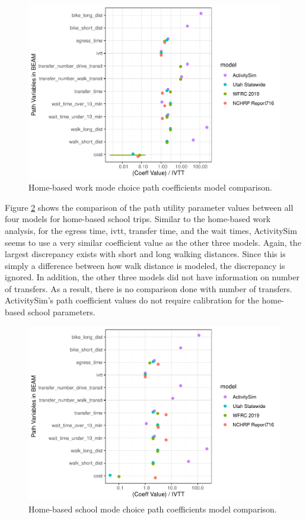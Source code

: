 \documentclass[3p, authoryear, review]{elsarticle} %
\begin{document}
\begin{figure}

{\centering \includegraphics{thesis_files/figure-latex/hbw-1} 

}

\caption{Home-based work mode choice path coefficients model comparison.}\label{fig:hbw}
\end{figure}

Figure \ref{fig:hbs} shows the comparison of the path utility parameter values between all four models for home-based school trips. Similar to the home-based work analysis, for the egress time, ivtt, transfer time, and the wait times, ActivitySim seems to use a very similar coefficient value as the other three models. Again, the largest discrepancy exists with short and long walking distances. Since this is simply a difference between how walk distance is modeled, the discrepancy is ignored. In addition, the other three models did not have information on number of transfers. As a result, there is no comparison done with number of transfers. ActivitySim's path coefficient values do not require calibration for the home-based school parameters.

\begin{figure}

{\centering \includegraphics{thesis_files/figure-latex/hbs-1} 

}

\caption{Home-based school mode choice path coefficients model comparison.}\label{fig:hbs}
\end{figure}
\end{document}
